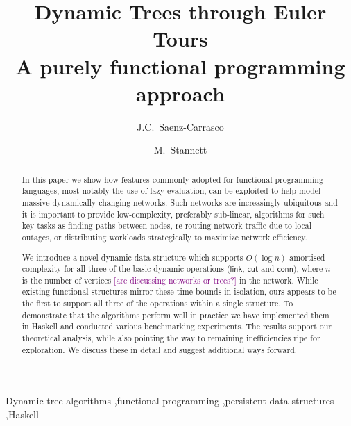 \documentclass{elsarticle}
\newcommand{\madd}[1]{\textcolor{Purple}{#1}}
\newcommand{\MATHSF}[1]{\ensuremath{\mathsf{#1}}\xspace}
\newcommand{\link}{\MATHSF{link}}
\newcommand{\cut}{\MATHSF{cut}}
\newcommand{\conn}{\MATHSF{conn}}
\begin{document}
\title{Dynamic Trees through Euler Tours\\%
\large{A purely functional programming approach}}

\author{J.C.~Saenz-Carrasco}

\author{M.~Stannett}

\address{Department of Computer Science,\\
Regent Court, 211 Portobello,\\
Sheffield S1 4DP, United Kingdom}


\begin{abstract}
In this paper we show how features commonly adopted for functional programming languages, most notably the use of lazy evaluation, can be exploited to help model massive dynamically changing networks. Such networks are increasingly ubiquitous and it is important to provide low-complexity, preferably sub-linear, algorithms for such key tasks as finding paths between nodes, re-routing network traffic due to local outages, or distributing workloads strategically to maximize network efficiency.

We introduce a novel dynamic data structure which supports $O(\log n)$ amortised complexity for all three of the basic dynamic operations (\link, \cut and \conn), where $n$ is the number of vertices \madd{[are discussing networks or trees?]} in the network. While existing functional structures mirror these time bounds in isolation, ours appears to be the first to support all three of the operations within a single structure. To demonstrate that the algorithms perform well in practice we have implemented them in Haskell and conducted various benchmarking experiments. The results support our theoretical analysis, while also pointing the way to remaining inefficiencies ripe for exploration. We discuss these in detail and suggest additional ways forward.
\end{abstract}

\begin{keyword}
Dynamic tree algorithms \sep functional programming \sep persistent data structures \sep Haskell
\end{keyword}


\maketitle






%
 
 
 
 

\end{document}
